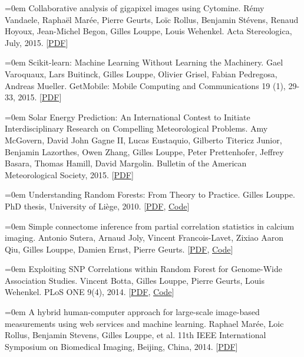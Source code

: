 \documentclass{scrartcl}
\newcommand{\MarginText}[1]{\marginpar{\raggedleft\itshape\small#1}}
\newcommand{\NewPublication}[4]{\noindent\hangindent=0em\hangafter=0 \MarginText{\color{black} #1}{\footnotesize [{\color{Maroon}#2}]} #3 {\footnotesize\color{gray}#4}\vspace{0.5em}}
\begin{document}
\begin{cv}{}
\NewPublication{}{13}{Collaborative analysis of gigapixel images using Cytomine.}{%
Rémy Vandaele, Raphaël Marée, Pierre Geurts, Loïc Rollus, Benjamin Stévens, Renaud Hoyoux, Jean-Michel Begon, Gilles Louppe, Louis Wehenkel.
Acta Stereologica, July, 2015.
[\href{http://popups.ulg.ac.be/0351-580X/index.php?id=3692&file=1&pid=3681}{PDF}]}

\NewPublication{}{12}{Scikit-learn: Machine Learning Without Learning the Machinery.}{%
Gael Varoquaux, Lars Buitinck, Gilles Louppe, Olivier Grisel, Fabian Pedregosa, Andreas Mueller.
GetMobile: Mobile Computing and Communications 19 (1), 29-33, 2015.
[\href{https://dl.acm.org/citation.cfm?id=2786995}{PDF}]}

\NewPublication{}{11}{Solar Energy Prediction: An International Contest to Initiate Interdisciplinary Research on Compelling Meteorological Problems.}{%
Amy McGovern, David John Gagne II, Lucas Eustaquio, Gilberto Titericz Junior, Benjamin Lazorthes, Owen Zhang, Gilles Louppe, Peter Prettenhofer, Jeffrey Basara, Thomas Hamill, David Margolin.
Bulletin of the American Meteorological Society, 2015.
[\href{http://hdl.handle.net/2268/177115}{PDF}]}

\NewPublication{2014}{10}{Understanding Random Forests: From Theory to Practice.}{%
Gilles Louppe.
PhD thesis, University of Li{\`e}ge, 2010.
[\href{http://hdl.handle.net/2268/170309}{PDF}, \href{https://github.com/glouppe/phd-thesis}{Code}]}

\NewPublication{}{9}{Simple connectome inference from partial correlation statistics in calcium imaging.}{%
Antonio Sutera, Arnaud Joly, Vincent Francois-Lavet, Zixiao Aaron Qiu, Gilles Louppe, Damien Ernst, Pierre Geurts.
[\href{http://hdl.handle.net/2268/169767}{PDF}, \href{https://github.com/glouppe/kaggle-connectomics}{Code}]}

\NewPublication{}{8}{Exploiting SNP Correlations within Random Forest for Genome-Wide Association Studies.}{%
Vincent Botta, Gilles Louppe, Pierre Geurts, Louis Wehenkel.
PLoS ONE 9(4), 2014.
[\href{http://dx.plos.org/10.1371/journal.pone.0093379}{PDF}, \href{https://github.com/0asa/TTree-source}{Code}]}

\NewPublication{}{7}{A hybrid human-computer approach for large-scale image-based measurements using web services and machine learning.}{%
Raphael Mar{\'e}e, Loic Rollus, Benjamin Stevens, Gilles Louppe, et al.
11th IEEE International Symposium on Biomedical Imaging, Beijing, China, 2014.
[\href{http://hdl.handle.net/2268/162084}{PDF}]}


\end{cv}
\end{document}
